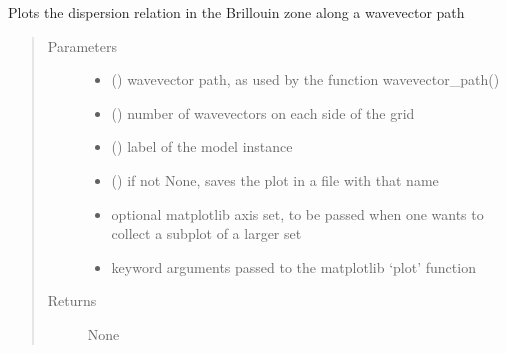 \documentclass[letterpaper,10pt,english]{sphinxmanual}
\begin{document}
\begin{fulllineitems}
\label{\detokenize{spectral:pyqcm.spectral.segment_dispersion}}
\sphinxAtStartPar
Plots the dispersion relation in the Brillouin zone along a wavevector path
\begin{quote}\begin{description}
\item[{Parameters}] \leavevmode\begin{itemize}
\item {} 
\sphinxAtStartPar
{} () \textendash{} wavevector path, as used by the function wavevector\_path()

\item {} 
\sphinxAtStartPar
{} () \textendash{} number of wavevectors on each side of the grid

\item {} 
\sphinxAtStartPar
{} () \textendash{} label of the model instance

\item {} 
\sphinxAtStartPar
{} () \textendash{} if not None, saves the plot in a file with that name

\item {} 
\sphinxAtStartPar
{} \textendash{} optional matplotlib axis set, to be passed when one wants to collect a subplot of a larger set

\item {} 
\sphinxAtStartPar
{} \textendash{} keyword arguments passed to the matplotlib ‘plot’ function

\end{itemize}

\item[{Returns}] \leavevmode
\sphinxAtStartPar
None

\end{description}\end{quote}

\end{fulllineitems}
\end{document}
